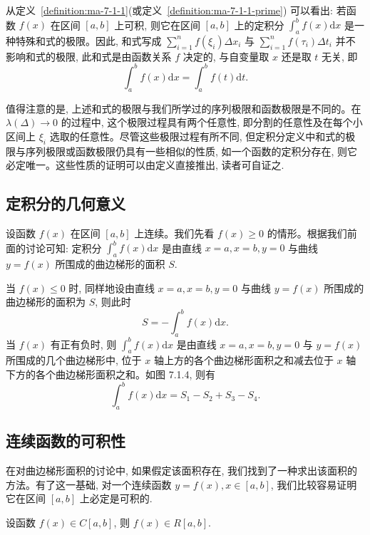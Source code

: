 从定义~\ref{definition:ma-7-1-1}(或定义~\ref{definition:ma-7-1-1-prime}) 可以看出: 若函数 $f(x)$ 在区间 $[a,b]$ 上可积, 则它在区间 $[a,b]$ 上的定积分 $\int_a^b f(x)\mathrm dx$ 是一种特殊和式的极限。因此, 和式写成 $\sum\limits_{i=1}^n f(\xi_i)\Delta x_i$ 与 $\sum\limits_{i=1}^n f(\tau_i)\Delta t_i$ 并不影响和式的极限, 此和式是由函数关系 $f$ 决定的, 与自变量取 $x$ 还是取 $t$ 无关, 即
\[
  \int_a^b f(x)\mathrm dx=\int_a^b f(t)\mathrm dt.
\]

值得注意的是, 上述和式的极限与我们所学过的序列极限和函数极限是不同的。在 $\lambda(\Delta)\to0$ 的过程中, 这个极限过程具有两个任意性, 即分割的任意性及在每个小区间上 $\xi_i$ 选取的任意性。尽管这些极限过程有所不同, 但定积分定义中和式的极限与序列极限或函数极限仍具有一些相似的性质, 如一个函数的定积分存在, 则它必定唯一。这些性质的证明可以由定义直接推出, 读者可自证之.

\subsection{定积分的几何意义}
\label{subsec:ma-7-1-3}

设函数 $f(x)$ 在区间 $[a,b]$ 上连续。我们先看 $f(x)\geq0$ 的情形。根据我们前面的讨论可知: 定积分 $\int_a^b f(x)\mathrm dx$ 是由直线 $x=a,x=b,y=0$ 与曲线 $y=f(x)$ 所围成的曲边梯形的面积 $S$.

当 $f(x)\leq0$ 时, 同样地设由直线 $x=a,x=b,y=0$ 与曲线 $y=f(x)$ 所围成的曲边梯形的面积为 $S$, 则此时
\[
  S=-\int_a^b f(x)\mathrm dx.
\]
当 $f(x)$ 有正有负时, 则 $\int_a^b f(x)\mathrm dx$ 是由直线 $x=a,x=b,y=0$ 与 $y=f(x)$ 所围成的几个曲边梯形中, 位于 $x$ 轴上方的各个曲边梯形面积之和减去位于 $x$ 轴下方的各个曲边梯形面积之和。如图 7.1.4, 则有
\[
  \int_a^b f(x)\mathrm dx=S_1-S_2+S_3-S_4.
\]

\subsection{连续函数的可积性}
\label{subsec:ma-7-1-4}

在对曲边梯形面积的讨论中, 如果假定该面积存在, 我们找到了一种求出该面积的方法。有了这一基础, 对一个连续函数 $y=f(x),x\in[a,b]$, 我们比较容易证明它在区间 $[a,b]$ 上必定是可积的.

\begin{theorem}\label{theorem:ma-7-1-1}
设函数 $f(x)\in C[a,b]$, 则 $f(x)\in R[a,b]$.
\end{theorem}


